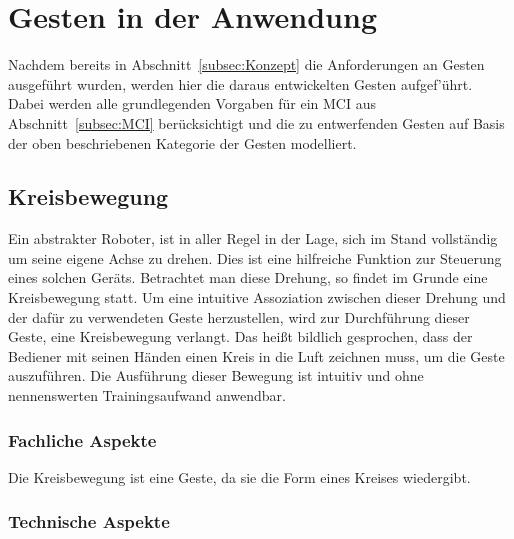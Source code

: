 \section{Gesten in der Anwendung}

Nachdem bereits in Abschnitt~\ref{subsec:Konzept} die Anforderungen an Gesten ausgef\"uhrt wurden, werden hier die daraus entwickelten Gesten aufgef'\"uhrt. Dabei werden alle grundlegenden Vorgaben f\"ur ein \gls{MCI} aus Abschnitt~\ref{subsec:MCI} ber\"ucksichtigt und die zu entwerfenden Gesten auf Basis der oben beschriebenen Kategorie der  Gesten modelliert.

\subsection{Kreisbewegung}
Ein abstrakter Roboter, ist in aller Regel in der Lage, sich im Stand vollst\"andig um seine eigene Achse zu drehen. Dies ist eine hilfreiche Funktion zur Steuerung eines solchen Ger\"ats. Betrachtet man diese Drehung, so findet im Grunde eine Kreisbewegung statt. Um eine intuitive Assoziation zwischen dieser Drehung und der daf\"ur zu verwendeten Geste herzustellen, wird zur Durchf\"uhrung dieser Geste, eine Kreisbewegung verlangt. Das hei\ss t bildlich gesprochen, dass der Bediener mit seinen H\"anden einen Kreis in die Luft zeichnen muss, um die Geste auszuf\"uhren.
\newline
Die Ausf\"uhrung dieser Bewegung ist intuitiv und ohne nennenswerten Trainingsaufwand anwendbar.

\subsubsection{Fachliche Aspekte}
Die Kreisbewegung ist eine  Geste, da sie die Form eines Kreises wiedergibt. 

\subsubsection{Technische Aspekte}


